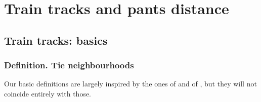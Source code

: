 \chapter{Train tracks and pants distance}

\section{Train tracks: basics}\label{sec:traintracks}

\subsection{Definition. Tie neighbourhoods}\label{sub:traintrackdefin}

Our basic definitions are largely inspired by the ones of \cite{mms} and of \cite{mosher}, but they will not coincide entirely with those.
